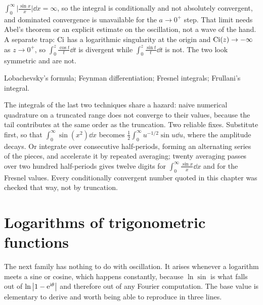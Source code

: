 \begin{trap}
$\int_0^{\infty}\bigl|\frac{\sin x}{x}\bigr|\dd x=\infty$, so the integral is conditionally and not absolutely convergent, and dominated convergence is unavailable for the $a\to0^{+}$ step. That limit needs Abel's theorem or an explicit estimate on the oscillation, not a wave of the hand. A separate trap: $\operatorname{Ci}$ has a logarithmic singularity at the origin and $\operatorname{Ci}(z)\to-\infty$ as $z\to0^{+}$, so $\int_0^{z}\frac{\cos t}{t}\dd t$ is divergent while $\int_0^{z}\frac{\sin t}{t}\dd t$ is not. The two look symmetric and are not.
\end{trap}

\begin{seealsob}Lobachevsky's formula; Feynman differentiation; Fresnel integrals; Frullani's integral.\end{seealsob}

\begin{keynote}
The integrals of the last two techniques share a hazard: naive numerical quadrature on a truncated range does not converge to their values, because the tail contributes at the same order as the truncation. Two reliable fixes. Substitute first, so that $\int_0^{\infty}\sin(x^{2})\dd x$ becomes $\tfrac12\int_0^{\infty}u^{-1/2}\sin u\dd u$, where the amplitude decays. Or integrate over consecutive half-periods, forming an alternating series of the pieces, and accelerate it by repeated averaging; twenty averaging passes over two hundred half-periods gives twelve digits for $\int_0^{\infty}\frac{\sin x}{x}\dd x$ and for the Fresnel values. Every conditionally convergent number quoted in this chapter was checked that way, not by truncation.
\end{keynote}

\section{Logarithms of trigonometric functions}

The next family has nothing to do with oscillation. It arises whenever a logarithm meets a sine or cosine, which happens constantly, because $\ln\sin$ is what falls out of $\ln\left\lvert 1-\mathrm{e}^{\mathrm{i}\theta}\right\rvert$ and therefore out of any Fourier computation. The base value is elementary to derive and worth being able to reproduce in three lines.

